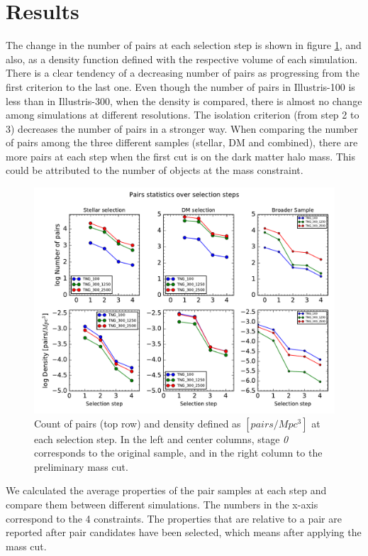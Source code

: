 \documentclass[fleqn,usenatbib]{mnras}
\begin{document}
\section{Results}
The change in the number of pairs at each selection step is shown in figure \ref{fig:pairs}, and also, as a density function defined with the respective volume of each simulation. There is a clear tendency of a decreasing number of pairs as progressing from the first criterion to the last one. Even though the number of pairs in Illustris-100 is less than in Illustris-300, when the density is compared, there is almost no change among simulations at different resolutions. The isolation criterion (from step 2 to 3) decreases the number of pairs in a stronger way. When comparing the number of pairs among the three different samples (stellar, DM and combined), there are more pairs at each step when the first cut is on the dark matter halo mass. This could be attributed to the number of objects at the mass constraint. 

\begin{figure}
\centering
\includegraphics[scale=0.5]{NumberPairs.pdf}
\caption{\label{fig:pairs} Count of pairs (top row) and density defined as $[pairs/Mpc^3]$ at each selection step. In the left and center columns, stage \textit{0} corresponds to the original sample, and in the right column to the preliminary mass cut.}
\end{figure}
 
 
We calculated the average properties of the pair samples at each step and compare them between different simulations. The numbers in the x-axis correspond to the 4 constraints. The properties that are relative to a pair are reported after pair candidates have been selected, which means after applying the mass cut. 
 
\end{document}
